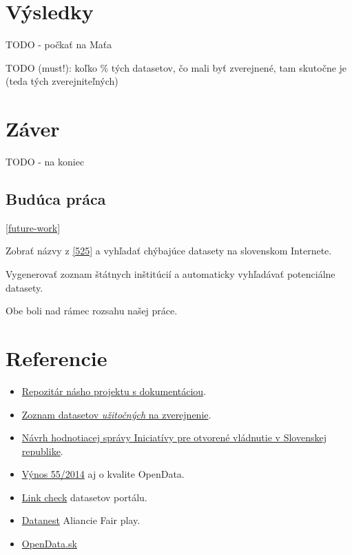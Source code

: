 \documentclass[12pt,a4paper]{article}
\begin{document}
\section{Výsledky}

TODO - počkať na Maťa 


TODO (must!): koľko \% tých datasetov, čo mali byť zverejnené, tam skutočne je (teda tých zverejniteľných)


\section{Záver} 

TODO - na koniec 

\subsection{Budúca práca} 
\ref{future-work}

Zobrať názvy z \ref{525} a vyhľadať chýbajúce datasety na slovenskom Internete. 

Vygenerovať zoznam štátnych inštitúcií a automaticky vyhľadávať potenciálne datasety.

Obe boli nad rámec rozsahu našej práce. 

\section{Referencie} 
\begin{itemize} 
  \item \label{proj} \href{https://github.com/koniiiik/opendata-sk-ias}{Repozitár násho projektu s dokumentáciou}. %
  \item \label{525} \href{http://www.otvorenavlada.gov.sk/datasety-statnej-spravy/}{Zoznam datasetov \emph{užitočných} na zverejnenie}.
  \item \label{hodnotenie} \href{http://www.otvorenavlada.gov.sk/navrh-hodnotiacej-spravy-iniciativy-pre-otvorene-vladnutie-v-slovenskej-republike/}{Návrh hodnotiacej správy Iniciatívy pre otvorené vládnutie v Slovenskej republike}.
  \item \label{kvalita} \href{http://www.zbierka.sk/sk/predpisy/55-2014-z-z.p-35621.pdf}{Výnos 55/2014} aj o kvalite OpenData. 
  \item \label{hany} \href{https://github.com/hanecak/data.gov.sk-link-check/}{Link check} datasetov portálu. 
  \item \label{datanest} \href{http://datanest.fair-play.sk/pages/index}{Datanest} Aliancie Fair play. 
  \item \label{opendata-sk} \href{http://opendata.sk/liferay/studia-open-data-portal}{OpenData.sk}
\end{itemize} 
\end{document}
